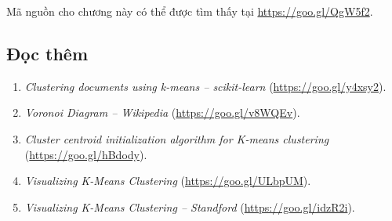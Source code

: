 Mã nguồn cho chương này có thể được tìm thấy tại \url{https://goo.gl/QgW5f2}. 



\subsection{Đọc thêm}

\begin{enumerate}
	\item \textit{Clustering documents using k-means -- scikit-learn} (\url{https://goo.gl/y4xsy2}).

	\item \textit{Voronoi Diagram -- Wikipedia} (\url{https://goo.gl/v8WQEv}).

	\item \textit{Cluster centroid initialization algorithm for K-means clustering} (\url{https://goo.gl/hBdody}). 

	\item \textit{Visualizing K-Means Clustering} (\url{https://goo.gl/ULbpUM}). 

	\item \textit{Visualizing K-Means Clustering -- Standford} (\url{https://goo.gl/idzR2i}). 

\end{enumerate}

